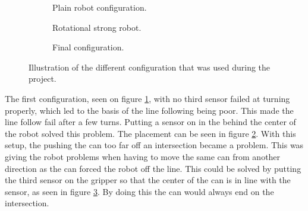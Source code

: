 \begin{figure}[H]
 \begin{subfigure}{0.32\textwidth}
 \centering
  \caption{Plain robot configuration.}
  \label{subfig:plain_robot}
 \end{subfigure}
 \begin{subfigure}{0.32\textwidth}
 \centering
  \caption{Rotational strong robot.}
  \label{subfig:rot_robot}
 \end{subfigure}
 \begin{subfigure}{0.32\textwidth}
 \centering
  \caption{Final configuration.}
  \label{subfig:final_robot}
 \end{subfigure}
\caption{Illustration of the different configuration that was used during the project.}
\label{fig:line_follow}
\end{figure}

The first configuration, seen on figure \ref{subfig:plain_robot}, with no third sensor failed at turning properly, which led to the basis of the line following being poor. This made the line follow fail after a few turns. Putting a sensor on in the behind the center of the robot solved this problem. The placement can be seen in figure \ref{subfig:rot_robot}. 
With this setup, the pushing the can too far off an intersection became a problem.
This was giving the robot problems when having to move the same can from another direction as the can forced the robot off the line.
This could be solved by putting the third sensor on the gripper so that the center of the can is in line with the sensor, as seen in figure \ref{subfig:final_robot}. 
By doing this the can would always end on the intersection. 

